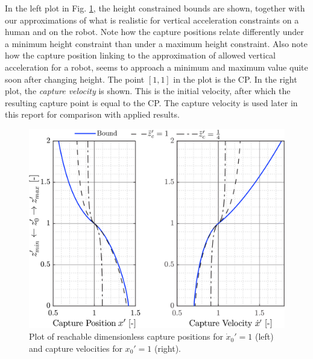 In the left plot in Fig. \ref{fig:caplimits}, the height constrained bounds are shown, together with our approximations of what is realistic for vertical acceleration constraints on a human and on the robot. Note how the capture positions relate differently under a minimum height constraint than under a maximum height constraint. Also note how the capture position linking to the approximation of allowed vertical acceleration for a robot, seems to approach a minimum and maximum value quite soon after changing height. The point $[1,1]$ in the plot is the \ac{CP}. In the right plot, the \textit{capture velocity} is shown. This is the initial velocity, after which the resulting capture point is equal to the \ac{CP}. The capture velocity is used later in this report for comparison with applied results.
\begin{figure}
      \centering
      \includegraphics[width=5.2in]{STYLESTUFF/caplimits1.png}
      \caption{Plot of reachable dimensionless capture positions for $\dot{x}_0'=1$ (left) and capture velocities for $x_0' = 1$ (right). }
      \label{fig:caplimits}
\end{figure}
